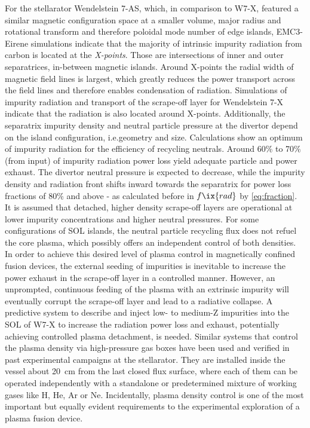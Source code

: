     For the stellarator Wendelstein 7-AS, which, in comparison to W7-X, featured a similar magnetic configuration space at a smaller volume, major radius and rotational transform and therefore poloidal mode number of edge islands, EMC3-Eirene simulations indicate that the majority of intrinsic impurity radiation from carbon is located at the \textit{X-points}. Those are intersections of inner and outer separatrices, in-between magnetic islands\cite{Harbour1989}. Around X-points the radial width of magnetic field lines is largest, which greatly reduces the power transport across the field lines and therefore enables condensation of radiation\cite{Feng2005,Thomsen2004}. Simulations of impurity radiation and transport of the scrape-off layer for Wendelstein 7-X indicate that the radiation is also located around X-points. Additionally, the separatrix impurity density and neutral particle pressure at the divertor depend on the island configuration, i.e.geometry and size. Calculations show an optimum of impurity radiation for the efficiency of recycling neutrals. Around 60\% to 70\% (from input) of impurity radiation power loss yield adequate particle and power exhaust. The divertor neutral pressure is expected to decrease, while the impurity density and radiation front shifts inward towards the separatrix for power loss fractions of 80\% and above - as calculated before in $f\ix{rad}$ by \cref{eq:fraction}. It is assumed that detached, higher density scrape-off layers are operational at lower impurity concentrations and higher neutral pressures. For some configurations of SOL islands, the neutral particle recycling flux does not refuel the core plasma, which possibly offers an independent control of both densities\cite{Feng2016}.\\%
    In order to achieve this desired level of plasma control in magnetically confined fusion devices, the external seeding of impurities is inevitable to increase the power exhaust in the scrape-off layer in a controlled manner\cite{Schmitz2020,Pacher2007,Kallenbach2013,Feng2016}. However, an unprompted, continuous feeding of the plasma with an extrinsic impurity will eventually corrupt the scrape-off layer and lead to a radiative collapse. A predictive system to describe and inject low- to medium-Z impurities into the SOL of W7-X to increase the radiation power loss and exhaust, potentially achieving controlled plasma detachment, is needed. Similar systems that control the plasma density via high-pressure gas boxes have been used and verified in past experimental campaigns at the stellarator. They are installed inside the vessel about \SI{20}{\centi\meter} from the last closed flux surface, where each of them can be operated independently with a standalone or predetermined mixture of working gases like H, He, Ar or Ne. Incidentally, plasma density control is one of the most important but equally evident requirements to the experimental exploration of a plasma fusion device\cite{Hirsch2013,Pedersen2015,Bosch2018}.\\%
